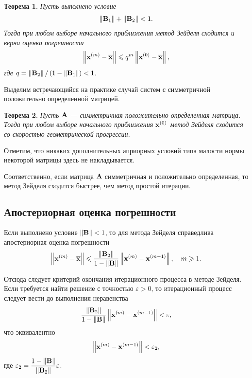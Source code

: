 \documentclass[12pt]{article}
\newtheorem{theorem}{Теорема}
\begin{document}
	\begin{theorem}
		Пусть выполнено условие
		\begin{equation}
			\left\|\bold{B}_1\right\|+\left\|\bold{B}_2\right\|<1.
		\end{equation}
	Тогда при любом выборе начального приближения метод Зейделя сходится и верна оценка погрешности
	\begin{equation}
		\left\|\bold{x}^{\left(m\right)}-\overline{\bold{x}}\right\|\leqslant q^{m}\left\|\bold{x}^{\left(0\right)}-\overline{\bold{x}}\right\|,
	\end{equation}
	где $q=\left\|\bold{B}_2\right\|/\left(1-\left\|\bold{B}_1\right\|\right)<1$.
	\end{theorem}
	
	Выделим встречающийся на практике случай систем с симметричной положительно определенной матрицей.
	\begin{theorem}
		Пусть $\bold{A}$ --- симметричная положительно определенная матрица. Тогда при любом выборе начального приближения $\bold{x}^{\left(0\right)}$ метод Зейделя сходится со скоростью геометрической прогрессии.
	\end{theorem}
	Отметим, что никаких дополнительных априорных условий типа малости нормы некоторой матрицы здесь не накладывается.
	
	Соответственно, если матрица $\bold{A}$ симметричная и положительно определенная, то метод Зейделя сходится быстрее, чем метод простой итерации.
	
	\subsection*{Апостериорная оценка погрешности}
	
	Если выполнено условие $\left\|\bold{B}\right\|<1$, то для метода Зейделя справедлива апостериорная оценка погрешности
	\begin{equation}
		\left\|\bold{x}^{\left(m\right)}-\overline{\bold{x}}\right\|\leqslant\frac{\left\|\bold{B}_2\right\|}{1-\left\|\bold{B}\right\|}\left\|\bold{x}^{\left(m\right)}-\bold{x}^{\left(m-1\right)}\right\|,\quad m\geqslant 1.
	\end{equation}
	
	Отсюда следует критерий окончания итерационного процесса в методе Зейделя. Если требуется найти решение с точностью $\varepsilon > 0$, то итерационный процесс следует вести до выполнения неравенства
	\begin{equation}
		\frac{\left\|\bold{B}_2\right\|}{1-\left\|\bold{B}\right\|}\left\|\bold{x}^{\left(m\right)}-\bold{x}^{\left(m-1\right)}\right\|<\varepsilon,
	\end{equation}
	что эквивалентно
	\begin{equation}
		\left\|\bold{x}^{\left(m\right)}-\bold{x}^{\left(m-1\right)}\right\|<\varepsilon_2,
	\end{equation}
	где $\varepsilon_2=\dfrac{1-\left\|\bold{B}\right\|}{\left\|\bold{B}_2\right\|}\varepsilon$.
	
\end{document}
